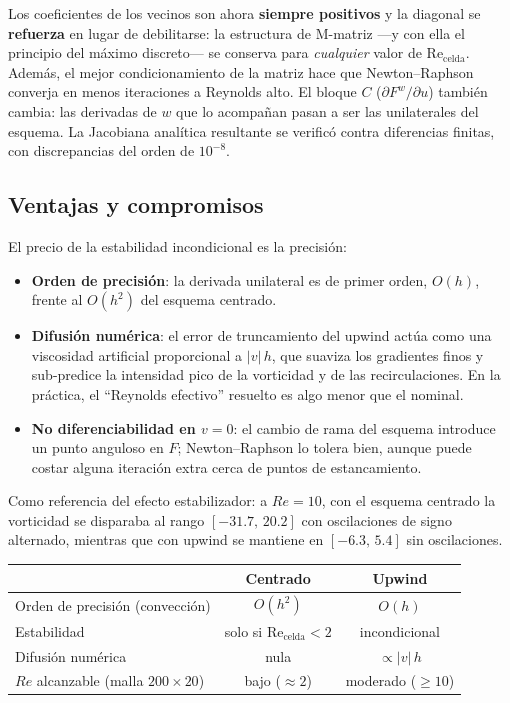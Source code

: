 \documentclass[12pt, a4paper]{article}
\begin{document}
Los coeficientes de los vecinos son ahora \textbf{siempre positivos} y la
diagonal se \textbf{refuerza} en lugar de debilitarse: la estructura de
M-matriz —y con ella el principio del máximo discreto— se conserva para
\emph{cualquier} valor de $\mathrm{Re}_{\text{celda}}$. Además, el mejor
condicionamiento de la matriz hace que Newton--Raphson converja en menos
iteraciones a Reynolds alto. El bloque $C$ ($\partial F^{w}/\partial u$)
también cambia: las derivadas de $w$ que lo acompañan pasan a ser las
unilaterales del esquema. La Jacobiana analítica resultante se verificó
contra diferencias finitas, con discrepancias del orden de $10^{-8}$.

\subsection{Ventajas y compromisos}

El precio de la estabilidad incondicional es la precisión:

\begin{itemize}
  \item \textbf{Orden de precisión}: la derivada unilateral es de primer
        orden, $O(h)$, frente al $O(h^{2})$ del esquema centrado.
  \item \textbf{Difusión numérica}: el error de truncamiento del upwind actúa
        como una viscosidad artificial proporcional a $|v|\,h$, que suaviza
        los gradientes finos y sub-predice la intensidad pico de la
        vorticidad y de las recirculaciones. En la práctica, el ``Reynolds
        efectivo'' resuelto es algo menor que el nominal.
  \item \textbf{No diferenciabilidad en $v = 0$}: el cambio de rama del
        esquema introduce un punto anguloso en $F$; Newton--Raphson lo tolera
        bien, aunque puede costar alguna iteración extra cerca de puntos de
        estancamiento.
\end{itemize}

Como referencia del efecto estabilizador: a $Re = 10$, con el esquema
centrado la vorticidad se disparaba al rango $[-31.7,\,20.2]$ con
oscilaciones de signo alternado, mientras que con upwind se mantiene en
$[-6.3,\,5.4]$ sin oscilaciones.

\begin{center}
\begin{tabular}{lcc}
  \toprule
   & \textbf{Centrado} & \textbf{Upwind} \\
  \midrule
  Orden de precisión (convección) & $O(h^{2})$ & $O(h)$ \\
  Estabilidad & solo si $\mathrm{Re}_{\text{celda}} < 2$ & incondicional \\
  Difusión numérica & nula & $\propto |v|\,h$ \\
  $Re$ alcanzable (malla $200\times20$) & bajo ($\approx 2$) & moderado ($\geq 10$) \\
  \bottomrule
\end{tabular}
\end{center}
\end{document}
